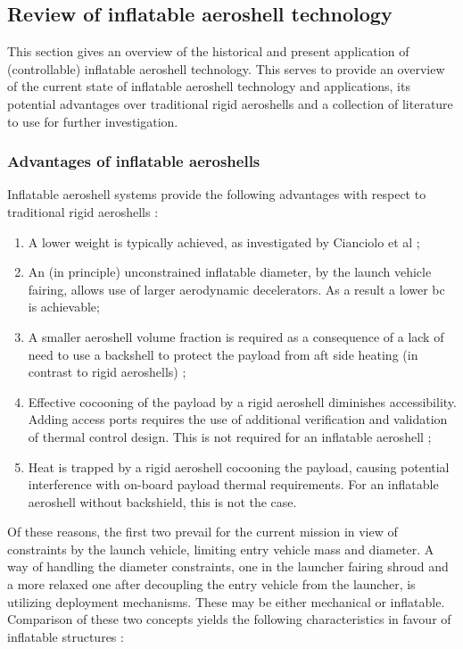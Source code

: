 \subsection{Review of inflatable aeroshell technology}\label{sec:aeroshells}
This section gives an overview of the historical and present application of (controllable) inflatable aeroshell technology. This serves to provide an overview of the current state of inflatable aeroshell technology and applications, its potential advantages over traditional rigid aeroshells and a collection of literature to use for further investigation.

\subsubsection{Advantages of inflatable aeroshells}
Inflatable aeroshell systems provide the following advantages with respect to traditional rigid aeroshells \cite{Cassapakis1995, Hughes2005}:
\begin{enumerate}
\item A lower weight is typically achieved, as investigated by Cianciolo et al \cite{Cianciolo2010};
\item An (in principle) unconstrained inflatable diameter, by the launch vehicle fairing, allows use of larger aerodynamic decelerators. As a result a lower \gls{bc} is achievable;
\item A smaller aeroshell volume fraction is required as a consequence of a lack of need to use a backshell to protect the payload from aft side heating (in contrast to rigid aeroshells) \cite{Hughes2005};
\item Effective cocooning of the payload by a rigid aeroshell diminishes accessibility. Adding access ports requires the use of additional verification and validation of thermal control design. This is not required for an inflatable aeroshell \cite{Johnson1997};
\item Heat is trapped by a rigid aeroshell cocooning the payload, causing potential interference with on-board payload thermal requirements. For an inflatable aeroshell without backshield, this is not the case.
\end{enumerate}
Of these reasons, the first two prevail for the current mission in view of constraints by the launch vehicle, limiting entry vehicle mass and diameter. A way of handling the diameter constraints, one in the launcher fairing shroud and a more relaxed one after decoupling the entry vehicle from the launcher, is utilizing deployment mechanisms. These may be either mechanical or inflatable. Comparison of these two concepts yields the following characteristics in favour of inflatable structures \cite{Cassapakis1995}:
